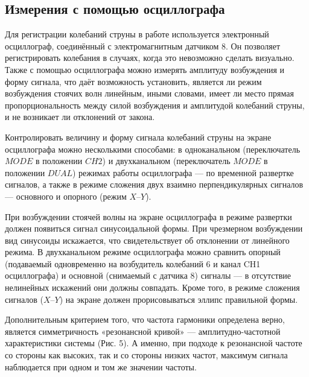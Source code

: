 \documentclass[a4paper, 12pt]{article} %
\begin{document}
\subsection{Измерения с помощью осциллографа}

Для регистрации колебаний струны в работе используется электронный
осциллограф, соединённый с электромагнитным датчиком 8. Он позволяет
регистрировать колебания в случаях, когда это невозможно сделать визуально. Также с помощью осциллографа можно измерять амплитуду возбуждения и форму сигнала, что даёт возможность установить, является ли режим
возбуждения стоячих волн линейным, иными словами, имеет ли место прямая пропорциональность между силой возбуждения и амплитудой колебаний
струны, и не возникает ли отклонений от закона. 

Контролировать величину и форму сигнала колебаний струны на экране
осциллографа можно несколькими способами: в одноканальном (переключатель $MODE$ в положении $CH2$) и двухканальном (переключатель $MODE$ в положении $DUAL$) режимах работы осциллографа — по временной развертке
сигналов, а также в режиме сложения двух взаимно перпендикулярных сигналов — основного и опорного (режим $X$--$Y$).

При возбуждении стоячей волны на экране осциллографа в режиме развертки должен появиться сигнал синусоидальной формы. При чрезмерном
возбуждении вид синусоиды искажается, что свидетельствует об отклонении
от линейного режима. В двухканальном режиме осциллографа можно сравнить опорный (подаваемый одновременно на возбудитель колебаний 6 и канал CH1 осциллографа) и основной (снимаемый с датчика 8) сигналы — в
отсутствие нелинейных искажений они должны совпадать. Кроме того, в режиме сложения сигналов ($X–Y$) на экране должен прорисовываться эллипс
правильной формы.

Дополнительным критерием того, что частота гармоники определена
верно, является симметричность «резонансной кривой» — амплитудно-частотной характеристики системы (Рис. 5). А именно, при подходе к резонансной частоте со стороны как высоких, так и со стороны низких частот, максимум сигнала наблюдается при одном и том же значении частоты.
\end{document}
